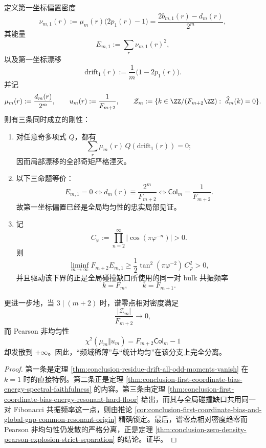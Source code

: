 \begin{theorem}\label{thm:conclusion-first-coordinate-bias-global-collision-resonance-homology}
定义第一坐标偏置密度
\[
\nu_{m,1}(r):=\mu_m(r)\bigl(2p_1(r)-1\bigr)
=
\frac{2b_{m,1}(r)-d_m(r)}{2^m},
\]
其能量
\[
E_{m,1}:=\sum_{r}\nu_{m,1}(r)^2,
\]
以及第一坐标漂移
\[
\mathrm{drift}_1(r):=\frac1m\bigl(1-2p_1(r)\bigr).
\]
并记
\[
\mu_m(r):=\frac{d_m(r)}{2^m},
\qquad
u_m(r):=\frac{1}{F_{m+2}},
\qquad
\mathcal Z_m:=\{k\in \ZZ/(F_{m+2}\ZZ):\ \widehat d_m(k)=0\}.
\]
则有三条同时成立的刚性：
\begin{enumerate}
  \item 对任意奇多项式 \(Q\)，都有
  \[
  \sum_r \mu_m(r)\,Q(\mathrm{drift}_1(r))=0;
  \]
  因而局部漂移的全部奇矩严格湮灭。
  \item 以下三命题等价：
  \[
  E_{m,1}=0
  \iff
  d_m(r)\equiv \frac{2^m}{F_{m+2}}
  \iff
  \mathsf{Col}_m=\frac1{F_{m+2}}.
  \]
  故第一坐标偏置已经是全局均匀性的忠实局部见证。
  \item 记
  \[
  C_\varphi:=\prod_{n=2}^{\infty}\bigl|\cos(\pi\varphi^{-n})\bigr|>0.
  \]
  则
  \[
  \liminf_{m\to\infty}F_{m+2}E_{m,1}
  \ge
  \frac12\tan^2(\pi\varphi^{-2})\,C_\varphi^2
  >0,
  \]
  并且驱动该下界的正是全局碰撞缺口所使用的同一对 bulk 共振频率
  \[
  k=F_m,
  \qquad
  k=F_{m+1}.
  \]
\end{enumerate}
更进一步地，当 \(3\mid(m+2)\) 时，谱零点相对密度满足
\[
\frac{|\mathcal Z_m|}{F_{m+2}}\to 0,
\]
而 Pearson 非均匀性
\[
\chi^2(\mu_m\Vert u_m)=F_{m+2}\mathsf{Col}_m-1
\]
却发散到 \(+\infty\)。因此，“频域稀薄”与“统计均匀”在该分支上完全分离。
\end{theorem}
\begin{proof}
第一条是定理 \ref{thm:conclusion-residue-drift-all-odd-moments-vanish} 在 \(k=1\) 时的直接特例。第二条正是定理 \ref{thm:conclusion-first-coordinate-bias-energy-spectral-faithfulness} 的内容。第三条由定理 \ref{thm:conclusion-first-coordinate-bias-energy-resonant-hard-floor} 给出，而其与全局碰撞缺口共用同一对 Fibonacci 共振频率这一点，则由推论 \ref{cor:conclusion-first-coordinate-bias-and-global-gap-common-resonant-origin} 精确锁定。最后，谱零点相对密度趋零而 Pearson 非均匀性仍发散的严格分离，正是定理 \ref{thm:conclusion-zero-density-pearson-explosion-strict-separation} 的结论。证毕。
\end{proof}


